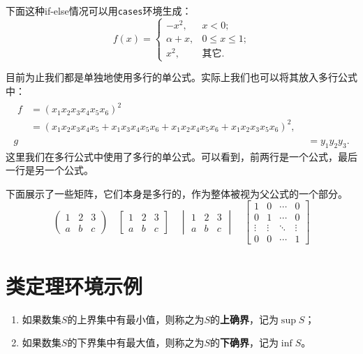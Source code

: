 \documentclass[zihao = -4, linespread = 1.5]{ctexart} %
\begin{document}
下面这种if-else情况可以用\texttt{cases}环境生成：
\begin{equation}
  f(x)
    = \begin{cases}
    -x^{2},            &\text{$x < 0$;}\\
    \alpha + x,     &\text{$0 \leq x \leq 1$;}\\
    x^{2},             &\text{其它.}
    \end{cases}
\end{equation}


目前为止我们都是单独地使用多行的单公式。实际上我们也可以将其放入多行公式中： %
\begin{align} %
\begin{split}
f &= (x_{1} x_{2} x_{3} x_{4} x_{5} x_{6})^{2}\\
&= (x_{1} x_{2} x_{3} x_{4} x_{5} + x_{1} x_{3} x_{4} x_{5} x_{6} + x_{1} x_{2} x_{4} x_{5} x_{6} + x_{1} x_{2} x_{3} x_{5} x_{6})^{2}, \end{split}\\
g &= y_{1} y_{2} y_{3}.
\end{align}
这里我们在多行公式中使用了多行的单公式。可以看到，前两行是一个公式，最后一行是另一个公式。

下面展示了一些矩阵，它们本身是多行的，作为整体被视为父公式的一个部分。
\[
\begin{pmatrix}
1 & 2 & 3\\
a & b & c
\end{pmatrix}
\quad
\begin{bmatrix}
1 & 2 & 3\\
a & b & c
\end{bmatrix}
\quad
\begin{vmatrix}
1 & 2 & 3\\
a & b & c
\end{vmatrix}
\quad
\begin{bmatrix}
1 & 0 & \cdots & 0 \\
 0 & 1 & \cdots & 0 \\
 \vdots & \vdots & \ddots & \vdots \\
 0 & 0 & \cdots & 1
 \end{bmatrix}
\]

\section{类定理环境示例}
\begin{definition}[上确界与下确界]\label{def:supremum}
\leavevmode %
\begin{enumerate}[label=(\arabic*),leftmargin=2\parindent]
  \item 如果数集$S$的上界集中有最小值，则称之为$S$的\textbf{上确界}，记为$\sup S$；
  \item 如果数集$S$的下界集中有最大值，则称之为$S$的\textbf{下确界}，记为$\inf S$。
\end{enumerate}
\end{definition}
\end{document}

